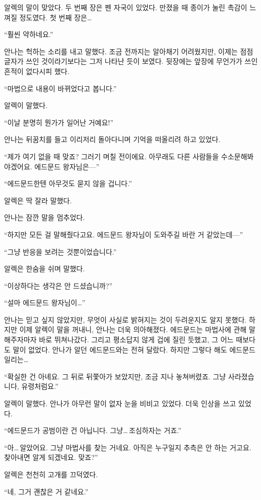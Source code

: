 알렉의 말이 맞았다. 두 번째 장은 펜 자국이 있었다. 만졌을 때 종이가 눌린 촉감이 느껴질 정도였다. 첫 번째 장은\ldots

``훨씬 약하네요.''

안나는 헉하는 소리를 내고 말했다. 조금 전까지는 알아채기 어려웠지만, 이제는 점점 글자가 쓰인 것이라기보다는 그저 나타난 듯이 보였다. 뒷장에는 앞장에 무언가가 쓰인 흔적이 없다시피 했다.

``마법으로 내용이 바뀌었다고 봅니다.''

알렉이 말했다.

``이날 분명히 뭔가가 일어난 거예요!''

안나는 뒤꿈치를 들고 이리저리 돌아다니며 기억을 떠올리려 하고 있었다.

``제가 여기 없을 때 맞죠? 그러기 며칠 전이에요. 아무래도 다른 사람들을 수소문해봐야겠어요. 에드문드 왕자님은—''

``에드문드한텐 아무것도 묻지 않을 겁니다.''

알렉은 딱 잘라 말했다.

안나는 잠깐 말을 멈추었다.

``하지만 모든 걸 말해줬다고요. 에드문드 왕자님이 도와주길 바란 거 같았는데—''

``그냥 반응을 보려는 것뿐이었습니다.''

알렉은 한숨을 쉬며 말했다.

``이상하다는 생각은 안 드셨습니까?''

``설마 에드문드 왕자님이\ldots''

안나는 믿고 싶지 않았지만, 무엇이 사실로 밝혀지는 것이 두려운지도 알지 못했다. 하지만 이제 알렉이 말을 꺼내니, 안나는 더욱 의아해졌다. 에드문드는 마법사에 관해 말해주자마자 바로 뛰쳐나갔다. 그리고 평소답지 않게 겁에 질린 듯했고, 그 어느 때보다도 말이 없었다. 안나가 알던 에드문드와는 전혀 달랐다. 하지만 그렇다 해도 에드문드일리는\ldots

``확실한 건 아녜요. 그 뒤로 뒤쫓아가 보았지만, 조금 지나 놓쳐버렸죠. 그냥 사라졌습니다, 유령처럼요.''

알렉이 말했다. 안나가 아무런 말이 없자 눈을 비비고 있었다. 더욱 인상을 쓰고 있었다.

``에드문드가 공범이란 건 아닙니다. 그냥\ldots\,조심하자는 거죠.''

``아\ldots\,알았어요. 그냥 마법사를 찾는 거네요. 아직은 누구일지 추측은 안 하는 거고요. 찾아내면 알게 되겠네요. 맞죠?''

알렉은 천천히 고개를 끄덕였다.

``네, 그거 괜찮은 거 같네요.''

